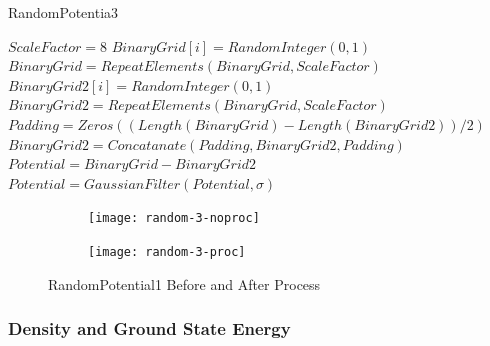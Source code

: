 \documentclass[a4paper,times,12pt]{article}
\begin{document}
\begin{algorithm}[H]
    \caption{RandomPotentia3}\label{euclid}
    \begin{algorithmic}[1]
        \State $ \textit{ScaleFactor} = 8$
        \State $BinaryGrid[i] = RandomInteger(0, 1)$
        \EndFor
        \State $BinaryGrid = RepeatElements(BinaryGrid, ScaleFactor)$
        \State $BinaryGrid2[i] = RandomInteger(0, 1)$
        \EndFor
        \State $BinaryGrid2 = RepeatElements(BinaryGrid, ScaleFactor)$
        \State $Padding = Zeros((Length(BinaryGrid) - Length(BinaryGrid2))/2)$
        \State $BinaryGrid2 = Concatanate(Padding, BinaryGrid2, Padding) $
        \State $Potential = BinaryGrid - BinaryGrid2$
        \State $Potential = GaussianFilter(Potential, \sigma)$ 
    \EndProcedure
    \end{algorithmic}
\label{alg:random_potential_1}
\end{algorithm}

\graphicspath{{"../figs/potentials/"}}
\begin{figure}[H]
    \centering
    \begin{subfigure}[t]{0.45\textwidth}
        \texttt{[image: random-3-noproc]}
		
    \end{subfigure}
    \begin{subfigure}[t]{0.45\textwidth}
        \texttt{[image: random-3-proc]}
		
    \end{subfigure}
\caption{RandomPotential1 Before and After Process}
\label{fig:random3_before_after}
\end{figure}

\subsubsection{Density and Ground State Energy}
\end{document}
